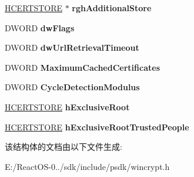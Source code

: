 \begin{DoxyCompactItemize}
\hyperlink{interfacevoid}{H\+C\+E\+R\+T\+S\+T\+O\+RE} $\ast$ {\bfseries rgh\+Additional\+Store}
\item 
\mbox{\label{struct___c_e_r_t___c_h_a_i_n___e_n_g_i_n_e___c_o_n_f_i_g_a4edaab6380c7fbe537f31b73d2d8cb56}} 
D\+W\+O\+RD {\bfseries dw\+Flags}
\item 
\mbox{\label{struct___c_e_r_t___c_h_a_i_n___e_n_g_i_n_e___c_o_n_f_i_g_aaa8626931e051d5b7a23b42faa9b75aa}} 
D\+W\+O\+RD {\bfseries dw\+Url\+Retrieval\+Timeout}
\item 
\mbox{\label{struct___c_e_r_t___c_h_a_i_n___e_n_g_i_n_e___c_o_n_f_i_g_a05654098c7fefb4726bd23d0b913a1ef}} 
D\+W\+O\+RD {\bfseries Maximum\+Cached\+Certificates}
\item 
\mbox{\label{struct___c_e_r_t___c_h_a_i_n___e_n_g_i_n_e___c_o_n_f_i_g_a152a11c92e6762dca55e42cc90178767}} 
D\+W\+O\+RD {\bfseries Cycle\+Detection\+Modulus}
\item 
\mbox{\label{struct___c_e_r_t___c_h_a_i_n___e_n_g_i_n_e___c_o_n_f_i_g_ad4aaf2edb25fb04a8fa92ed72349b9a5}} 
\hyperlink{interfacevoid}{H\+C\+E\+R\+T\+S\+T\+O\+RE} {\bfseries h\+Exclusive\+Root}
\item 
\mbox{\label{struct___c_e_r_t___c_h_a_i_n___e_n_g_i_n_e___c_o_n_f_i_g_a2efa9455834ceea2193b08d41587a708}} 
\hyperlink{interfacevoid}{H\+C\+E\+R\+T\+S\+T\+O\+RE} {\bfseries h\+Exclusive\+Root\+Trusted\+People}
\end{DoxyCompactItemize}


该结构体的文档由以下文件生成\+:\begin{DoxyCompactItemize}
\item 
E\+:/\+React\+O\+S-\/0../sdk/include/psdk/wincrypt.\+h\end{DoxyCompactItemize}

